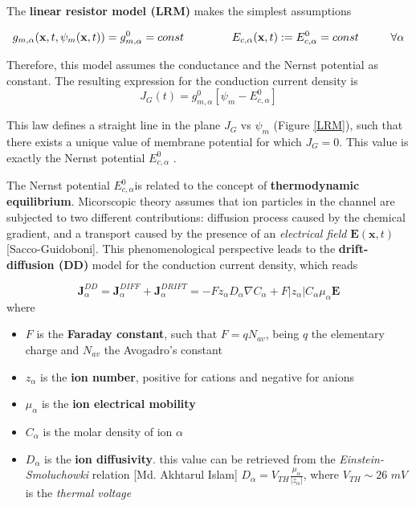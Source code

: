 \documentclass[12pt, a4paper]{article}
\begin{document}
The \textbf{linear resistor model (LRM)} makes the simplest assumptions 

\begin{equation}
g_{m,\alpha}(\textbf{x},t,\psi_m(\textbf{x},t)) = g_{m,\alpha}^0 = const \hspace{1.5 cm} E_{c,\alpha}(\textbf{x},t) := E_{c,\alpha}^0 = const \hspace{1cm} \forall \alpha
\end{equation}

Therefore, this model assumes the conductance and the Nernst potential as constant.
The resulting expression for the conduction current density is
\begin{equation}
J_G(t) = g_{m,\alpha}^0 [\psi_m -  E_{c,\alpha}^0]
\end{equation}

This law defines a straight line in the plane $J_G$ vs $\psi_m$ (Figure \ref*{LRM}), such that there exists a unique value of membrane potential for which $J_G=0$. This value is exactly the Nernst potential $E_{c,\alpha}^0$ .


The Nernst potential $E_{c,\alpha}^0$is related to the concept of  \textbf{thermodynamic equilibrium}. Micorscopic theory assumes that ion particles in the channel are subjected to two different contributions: diffusion process caused by the chemical gradient, and a transport caused by the presence of an \textit{electrical field} $\textbf{E}(\textbf{x},t)$ [Sacco-Guidoboni]. This phenomenological perspective leads to the \textbf{drift-diffusion (DD)} model for the conduction current density, which reads

\begin{equation}
\textbf{J}_{\alpha}^{DD} = \textbf{J}_{\alpha}^{DIFF} + \textbf{J}_{\alpha}^{DRIFT} = -Fz_{\alpha}D_{\alpha}\nabla C_{\alpha} + F|z_{\alpha}| C_{\alpha}\mu_{\alpha}\textbf{E}
\label{DD}
\end{equation}
where 
\begin{itemize}
	
	\item $F$ is the \textbf{Faraday constant}, such that $F = q N_{av}$, being $q$ the elementary charge and $N_{av}$ the Avogadro's constant
	
	\item $z_{\alpha}$ is the \textbf{ion number}, positive for cations and negative for anions
	
	\item $\mu_{\alpha}$ is the \textbf{ion electrical mobility}
	
	\item $C_{\alpha}$ is the molar density of ion $\alpha$
	
	\item $D_{\alpha}$ is the \textbf{ion diffusivity}. this value can be retrieved from the \textit{Einstein-Smoluchowki} relation [Md. Akhtarul Islam] $D_{\alpha} = V_{TH}\frac{\mu_{\alpha}}{|z_{\alpha}|}$, where $ V_{TH} \sim 26$ $mV$ is the \textit{thermal voltage}
\end{itemize}
\end{document}
